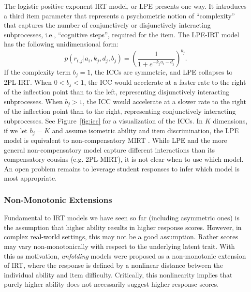 The logistic positive exponent IRT model, or LPE \cite{samejima2000logistic} presents one way. It introduces a third item parameter that represents a psychometric notion of ``complexity'' that captures the number of conjunctively or disjunctively interacting subprocesses, i.e., ``cognitive steps'', required for the item. The LPE-IRT model has the following unidimensional form:
\begin{equation}
    p(r_{i,j}|a_i, k_j, d_j, b_j) = \left(\frac{1}{1 + e^{-k_j a_i - d_j}}\right)^{b_j}.
\label{eq:lpe_mirt}
\end{equation}
If the complexity term $b_j = 1$, the ICCs are symmetric, and LPE collapses to 2PL-IRT. When $0 < b_j < 1$, the ICC would accelerate at a faster rate to the right of the inflection point than to the left, representing disjunctively interacting subprocesses. When $b_j > 1$, the ICC would accelerate at a slower rate to the right of the inflection point than to the right, representing conjunctively interacting subprocesses. 
See Figure~\ref{fig:icc} for a visualization of the ICCs. 
In $K$ dimensions, if we let $b_j = K$ and assume isometric ability and item discrimination, the LPE model is equivalent to non-compensatory MIRT \cite{sympson1978model,ackerman1989unidimensional}.
While LPE and the more general non-compensatory model capture different interactions than its compensatory cousins (e.g. 2PL-MIRT), it is not clear when to use which model. 
An open problem remains to leverage student responses to infer which model is most appropriate.

\subsubsection{Non-Monotonic Extensions}

Fundamental to IRT models we have seen so far (including asymmetric ones) is the assumption that higher ability results in higher response scores.
However, in complex real-world settings, this may not be a good assumption. Rather scores may vary non-monotonically with respect to the underlying latent trait.
With this as motivation, \textit{unfolding} models were proposed as a non-monotonic extension of IRT, where the response is defined by a nonlinear distance between the individual ability and item difficulty.
Critically, this nonlinearity implies that purely higher ability does not necessarily suggest higher response scores.

